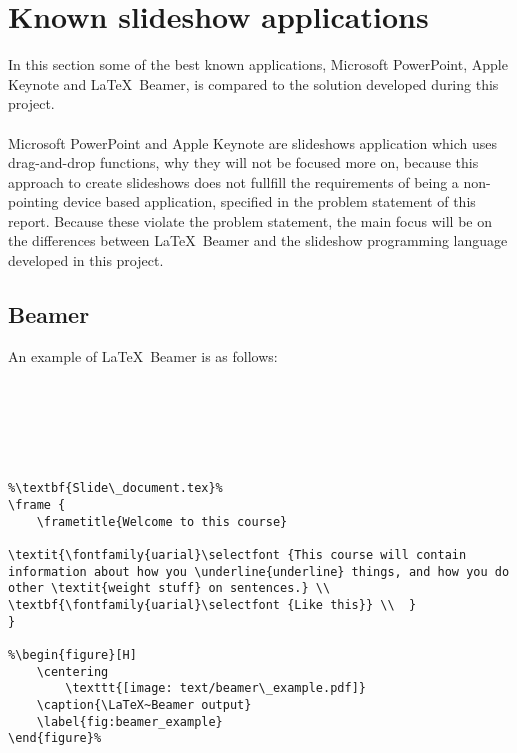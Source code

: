 \chapter{Known slideshow applications}
In this section some of the best known applications, Microsoft PowerPoint, Apple Keynote and \LaTeX~Beamer, is compared to the solution developed during this project.
\\ \\
Microsoft PowerPoint and Apple Keynote are slideshows application which uses drag-and-drop functions, why they will not be focused more on, because this approach to create slideshows does not fullfill the requirements of being a non-pointing device based application, specified in the problem statement of this report. Because these violate the problem statement, the main focus will be on the differences between \LaTeX~Beamer and the slideshow programming language developed in this project.


\section{Beamer}

An example of \LaTeX~Beamer is as follows:

\begin{lstlisting}[frame=single, caption={Beamer example}, label=lst_beamer]
%\textbf{Main\_document.tex}%






%\textbf{Slide\_document.tex}%
\frame {
	\frametitle{Welcome to this course}

\textit{\fontfamily{uarial}\selectfont {This course will contain information about how you \underline{underline} things, and how you do other \textit{weight stuff} on sentences.} \\
\textbf{\fontfamily{uarial}\selectfont {Like this}} \\	}
}

%\begin{figure}[H]
	\centering
		\texttt{[image: text/beamer\_example.pdf]}
	\caption{\LaTeX~Beamer output}
	\label{fig:beamer_example}
\end{figure}%

\end{lstlisting}

